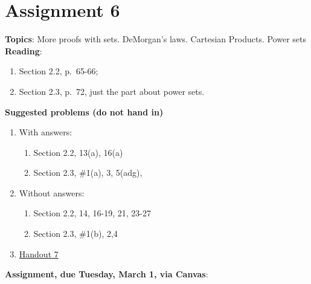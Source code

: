 \documentclass[12pt]{article}
\begin{document}

\newpage
\section[6 (due March 1): More sets. DeMorgan's laws. Cartesian Products. Power sets.]{Assignment 6}

\textbf{Topics}: More proofs with sets. DeMorgan's laws. Cartesian Products. Power sets
\\

\noindent \textbf{Reading}:
\begin{enumerate}
\item Section 2.2, p.~65-66; 
\item Section 2.3, p.~72, just the part about
 power sets.
\end{enumerate}





\noindent \textbf{Suggested problems (do not hand in)}
 
\begin{enumerate}
\item With answers:
 \begin{enumerate}
 \item Section 2.2, 13(a), 16(a) 
 \item Section 2.3, \#1(a), 3, 5(adg),
 \end{enumerate}

\item Without answers:
 \begin{enumerate}
 \item Section 2.2, 14, 16-19, 21, 23-27
 \item Section 2.3, \#1(b), 2,4
 \end{enumerate}

 \item \href{https://www.math.emory.edu/~dzb/teaching/250Fall2021/handouts/250-H07-sets-II.pdf}{Handout 7}
\end{enumerate}


\noindent \textbf{Assignment, due Tuesday, March 1, via Canvas}:
\end{document}
